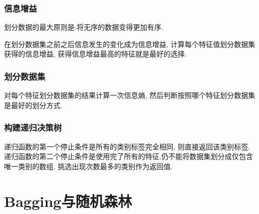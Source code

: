 \documentclass[12pt]{article}
\numberwithin{equation}{section}%
\begin{document}
\subsubsection{信息增益}

划分数据的最大原则是:将无序的数据变得更加有序.

在划分数据集之前之后信息发生的变化成为信息增益, 计算每个特征值划分数据集获得的信息增益, 获得信息增益最高的特征就是最好的选择.

\subsubsection{划分数据集}

对每个特征划分数据集的结果计算一次信息熵, 然后判断按照哪个特征划分数据集是最好的划分方式.

\subsubsection{构建递归决策树}

递归函数的第一个停止条件是所有的类别标签完全相同, 则直接返回该类别标签. 递归函数的第二个停止条件是使用完了所有的特征,仍不能将数据集划分成仅包含唯一类别的数组. 挑选出现次数最多的类别作为返回值. 





\section{Bagging与随机森林}




\end{document}
